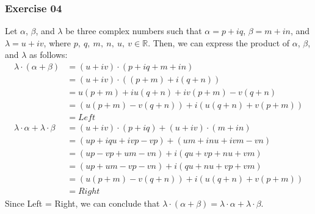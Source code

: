 \subsubsection*{Exercise 04}

\begin{flushleft}
Let $\alpha$, $\beta$, and $\lambda$ be three complex numbers such that $\alpha = p + iq$, $\beta  = m + in$, and $\lambda = u + iv$, where $p,\ q,\ m,\ n,\ u,\ v \in \mathbb{R}$. Then, we can express the product of $\alpha$, $\beta$, and $\lambda$ as follows:
\begin{align*}
\lambda \cdot (\alpha + \beta) &= (u + iv) \cdot (p + iq + m + in) \\
                               &= (u + iv) \cdot ((p + m) + i(q + n)) \\
                               &= u(p + m) + iu(q + n) + iv(p + m) - v(q + n) \\
                               &= (u(p + m) - v(q + n)) + i(u(q + n) + v(p + m)) \\
                               &= Left \\ 
\lambda \cdot \alpha + \lambda  \cdot \beta &= (u + iv) \cdot (p + iq) + (u + iv) \cdot (m + in) \\
                                            &= (up + iqu + ivp - vp) + (um + inu + ivm - vn) \\
                                            &= (up - vp + um - vn) + i(qu + vp + nu + vm) \\
                                            &= (up + um - vp - vn) + i(qu + nu + vp + vm) \\
                                            &= (u(p + m) - v(q + n)) + i(u(q + n) + v(p + m)) \\
                                            &= Right
\end{align*}
Since Left = Right, we can conclude that $\lambda \cdot (\alpha + \beta) = \lambda \cdot \alpha + \lambda  \cdot \beta$.
\end{flushleft}

